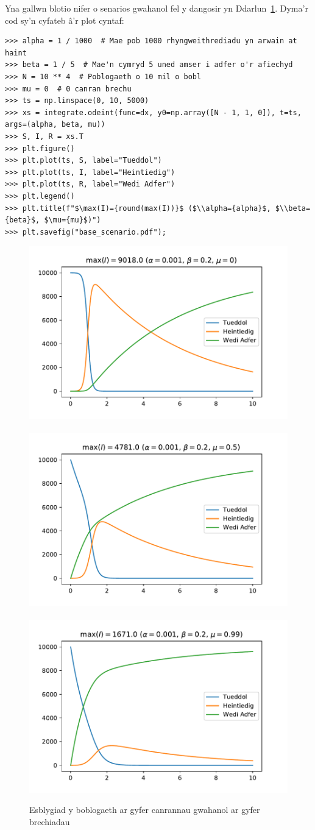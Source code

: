 \documentclass[a4paper]{article}
\begin{document}
Yna gallwn blotio nifer o senarios gwahanol fel y dangosir yn
Ddarlun~\ref{fig:scenarios}. Dyma'r cod sy'n cyfateb \^{a}'r plot cyntaf:

\begin{verbatim}
>>> alpha = 1 / 1000  # Mae pob 1000 rhyngweithrediadu yn arwain at haint
>>> beta = 1 / 5  # Mae'n cymryd 5 uned amser i adfer o'r afiechyd
>>> N = 10 ** 4  # Poblogaeth o 10 mil o bobl
>>> mu = 0  # 0 canran brechu
>>> ts = np.linspace(0, 10, 5000)
>>> xs = integrate.odeint(func=dx, y0=np.array([N - 1, 1, 0]), t=ts, args=(alpha, beta, mu))
>>> S, I, R = xs.T
>>> plt.figure()
>>> plt.plot(ts, S, label="Tueddol")
>>> plt.plot(ts, I, label="Heintiedig")
>>> plt.plot(ts, R, label="Wedi Adfer")
>>> plt.legend()
>>> plt.title(f"$\max(I)={round(max(I))}$ ($\\alpha={alpha}$, $\\beta={beta}$, $\mu={mu}$)")
>>> plt.savefig("base_scenario.pdf");
\end{verbatim}

\begin{figure}[!hbtp]
    \begin{center}
        \includegraphics[width=.3\textwidth]{base_scenario.pdf}
        ~
        \includegraphics[width=.3\textwidth]{moderate_vaccination_rate.pdf}
        ~
        \includegraphics[width=.3\textwidth]{high_vaccination_rate.pdf}
        \caption{Esblygiad y boblogaeth ar gyfer canrannau gwahanol ar gyfer brechiadau}
        \label{fig:scenarios}
    \end{center}
\end{figure}
\end{document}
